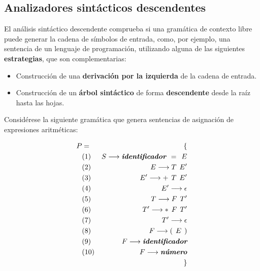 \subsection{Analizadores sintácticos descendentes}\label{sec:descendente}

El análisis sintáctico descendente comprueba si una gramática de contexto libre puede generar la cadena de símbolos de  entrada, como, por ejemplo, una sentencia de un lenguaje de programación, utilizando alguna de las siguientes {\bf estrategias}, que son complementarias:
\begin{itemize}
\item Construcción de una \textbf{derivación por la izquierda} de la cadena de entrada.
\item Construcción de un \textbf{árbol sintáctico} de forma \textbf{descendente} desde la raíz hasta las hojas.
\end{itemize}

Considérese la siguiente gramática que genera sentencias de asignación de expresiones aritméticas:

\begin{eqnarray*}
  P & = & \{ \\
     & (1) & S \longrightarrow \mbox{\bf\em identificador } = \hspace{1ex} E \\
     & (2) & E \longrightarrow T \hspace{1ex} E' \\
     & (3) & E' \longrightarrow + \hspace{1ex} T \hspace{1ex} E' \\
     & (4) & E' \longrightarrow \epsilon \\     
     & (5) & T \longrightarrow F \hspace{1ex} T' \\
     & (6) & T' \longrightarrow * \hspace{1ex} F \hspace{1ex} T' \\
     & (7) & T' \longrightarrow \epsilon \\     
     & (8) & F \longrightarrow ( \hspace{1ex} E \hspace{1ex} ) \\
     & (9) & F \longrightarrow \mbox{\bf\em identificador} \\
     & (10) & F \longrightarrow \mbox{\bf\em número} \\ 
     &   &\}
\end{eqnarray*}

